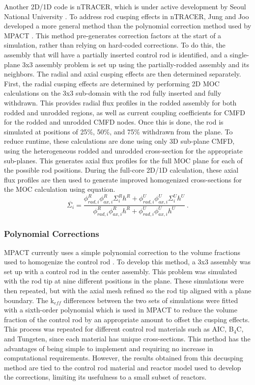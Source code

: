 Another 2D/1D code is nTRACER, which is under active development by Seoul National University \cite{RyuBEAVRSnTRACER2015}.  To address rod cusping effects in nTRACER, Jung and Joo developed a more general method than the polynomial correction method used by MPACT \cite{ICAPPcontrolRodDecuspingNTRACER}.  This method pre-generates correction factors at the start of a simulation, rather than relying on hard-coded corrections.  To do this, the assembly that will have a partially inserted control rod is identified, and a single-plane 3x3 assembly problem is set up using the partially-rodded assembly and its neighbors.  The radial and axial cusping effects are then determined separately.  First, the radial cusping effects are determined by performing 2D MOC calculations on the 3x3 sub-domain with the rod fully inserted and fully withdrawn.  This provides radial flux profiles in the rodded assembly for both rodded and unrodded regions, as well as current coupling coefficients for CMFD for the rodded and unrodded CMFD nodes.  Once this is done, the rod is simulated at positions of 25\%, 50\%, and 75\% withdrawn from the plane.  To reduce runtime, these calculations are done using only 3D sub-plane CMFD, using the heterogeneous rodded and unrodded cross-section for the appropriate sub-planes.  This generates axial flux profiles for the full MOC plane for each of the possible rod positions.  During the full-core 2D/1D calculation, these axial flux profiles are then used to generate improved homogenized cross-sections for the MOC calculation using equation.
\begin{equation}\label{e:nTRACERdecusping}
\overline{\Sigma_i} = \frac{\phi_{rad,i}^R \phi_{ax,i}^R \Sigma_i^R h^R + \phi_{rad,i}^U \phi_{ax,i}^U \Sigma_i^U h^U}{\phi_{rad,i}^R \phi_{ax,i}^R h^R + \phi_{rad,i}^U \phi_{ax,i}^U h^U}\ .
\end{equation}

\subsubsection{Polynomial Corrections}\label{sss:polynomialDecusping}

MPACT currently uses a simple polynomial correction to the volume fractions used to homogenize the control rod \cite{MC2015_VCS_Cycle_Depletion}.  To develop this method, a 3x3 assembly was set up with a control rod in the center assembly.  This problem was simulated with the rod tip at nine different positions in the plane.  These simulations were then repeated, but with the axial mesh refined so the rod tip aligned with a plane boundary.  The k$_{eff}$ differences between the two sets of simulations were fitted with a sixth-order polynomial which is used in MPACT to reduce the volume fraction of the control rod by an appropriate amount to offset the cusping effects.  This process was repeated for different control rod materials such as AIC, B$_4$C, and Tungsten, since each material has unique cross-sections.  This method has the advantages of being simple to implement and requiring no increase in computational requirements.  However, the results obtained from this decusping method are tied to the control rod material and reactor model used to develop the corrections, limiting its usefulness to a small subset of reactors.

